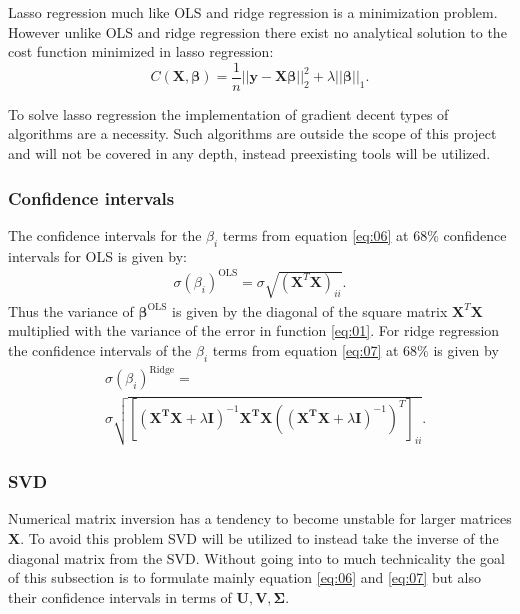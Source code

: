 \documentclass[uio,jmp,amsmath,amssymb,reprint,nofootinbib]{revtex4-1}
\numberwithin{equation}{section}
\newcommand{\lp}{\left(}
\newcommand{\rp}{\right)}
\newcommand{\lsb}{\left[}
\newcommand{\rsb}{\right]}
\begin{document}
Lasso regression much like OLS and ridge regression is a minimization problem. However unlike OLS and ridge regression there exist no analytical solution to the cost function minimized in lasso regression:
\begin{equation}
C(\boldsymbol{X},\boldsymbol{\beta})=\frac{1}{n}\vert\vert \boldsymbol{y}-\boldsymbol{X}\boldsymbol{\beta}\vert\vert_2^2+\lambda\vert\vert \boldsymbol{\beta}\vert\vert_1.
\end{equation}

To solve lasso regression the implementation of gradient decent types of algorithms are a necessity. Such algorithms are outside the scope of this project and will not be covered in any depth, instead preexisting tools will be utilized.

\subsubsection{Confidence intervals}

The confidence intervals for the \(\beta_i\) terms from equation \ref{eq:06} at \(68\%\) confidence intervals for OLS is given by:
\begin{align}\label{eq:12}
\sigma(\beta_i)^{\text{OLS}} = \sigma\sqrt{(\bm{X}^T\bm{X})_{ii}}.
\end{align}
Thus the variance of \(\bm{\beta}^{\text{OLS}}\) is given by the diagonal of the square matrix \(\bm{X}^T\bm{X}\) multiplied with the variance of the error in function \ref{eq:01}. For ridge regression the confidence intervals of the \(\beta_i\) terms from equation \ref{eq:07} at \(68\%\) is given by
\begin{align*}
&\sigma(\beta_i)^{\text{Ridge}} = \\
&\sigma\sqrt{ \lsb\lp\bm{X^TX} + \lambda\bm{I}\rp^{-1}\bm{X^TX}\lp\lp\bm{X^TX} + \lambda\bm{I}\rp^{-1}\rp^T\rsb_{ii} }.
\end{align*}

\subsubsection{SVD}

Numerical matrix inversion has a tendency to become unstable for larger matrices \(\bm{X}\). To avoid this problem SVD will be utilized to instead take the inverse of the diagonal matrix from the SVD. Without going into to much technicality the goal of this subsection is to formulate mainly equation \ref{eq:06} and \ref{eq:07} but also their confidence intervals in terms of \(\bm{U, V, \Sigma}\).
\end{document}
